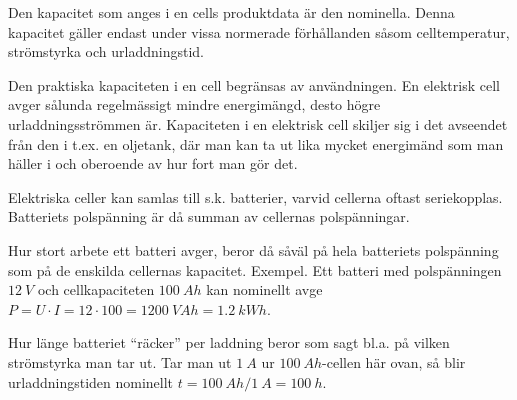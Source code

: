 Den kapacitet som anges i en cells produktdata är den nominella. Denna kapacitet
gäller endast under vissa normerade förhållanden såsom celltemperatur,
strömstyrka och urladdningstid.

Den praktiska kapaciteten i en cell begränsas av användningen. En elektrisk cell
avger sålunda regelmässigt mindre energimängd, desto högre urladdningsströmmen
är. Kapaciteten i en elektrisk cell skiljer sig i det avseendet från den i
t.ex. en oljetank, där man kan ta ut lika mycket energimänd som man häller i
och oberoende av hur fort man gör det.

Elektriska celler kan samlas till s.k. batterier, varvid cellerna oftast
seriekopplas.
Batteriets polspänning är då summan av cellernas polspänningar.

Hur stort arbete ett batteri avger, beror då såväl på hela batteriets
polspänning som på de enskilda cellernas kapacitet.
Exempel.
Ett batteri med polspänningen \(12\ V\) och cellkapaciteten \(100\ Ah\) kan
nominellt avge
\(P = U \cdot I = 12 \cdot 100 = 1200\ VAh = 1.2\ kWh\).

Hur länge batteriet ``räcker'' per laddning beror som sagt bl.a. på vilken
strömstyrka man tar ut. Tar man ut \(1\ A\) ur \(100\ Ah\)-cellen här ovan, så
blir urladdningstiden nominellt \(t = 100\ Ah/1\ A = 100\ h\).
